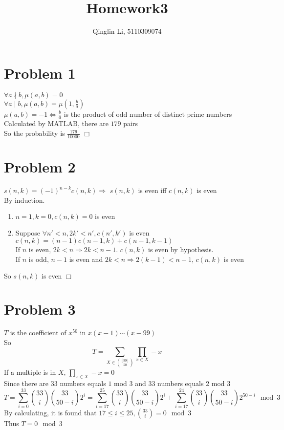 \documentclass[12pt]{article}
\date{}
\title{Homework3}
\author{Qinglin Li, 5110309074}
\def\qed{\hfill\mbox{$\Box$}}
\begin{document}
\maketitle
\section*{Problem 1}
$\forall a\nmid b, \mu(a,b)=0$\\
$\forall a\mid b, \mu(a,b)=\mu(1,\frac{b}{a})$\\
$\mu(a,b)=-1\Longleftrightarrow \frac{b}{a}$ is the product of odd number of distinct prime numbers\\
Calculated by MATLAB, there are $179$ pairs\\
So the probability is $\frac{179}{10000}$
\qed
\section*{Problem 2}
$s(n,k)=(-1)^{n-k}c(n,k)\Rightarrow$ $s(n,k)$ is even iff $c(n,k)$ is even\\
By induction.
\begin{enumerate}
\item
$n=1,k=0, c(n,k)=0$ is even
\item
Suppose $\forall n'<n, 2k'<n', c(n',k')$ is even\\
$c(n,k)=(n-1)c(n-1,k)+c(n-1,k-1)$\\
If $n$ is even, $2k<n\Rightarrow 2k<n-1$. $c(n,k)$ is even by hypothesis.\\
If $n$ is odd, $n-1$ is even and $2k<n\Rightarrow 2(k-1)<n-1$, $c(n,k)$ is even\\
\end{enumerate}
So $s(n,k)$ is even
\qed
\section*{Problem 3}
$T$ is the coefficient of $x^{50}$ in $x(x-1)\cdots(x-99)$\\
So
$$T=\displaystyle\sum_{X\in\binom{[99]}{50}}\prod_{x\in X}-x$$
If a multiple is in $X$, $\prod_{x\in X} -x = 0$\\
Since there are $33$ numbers equals $1$ mod $3$ and $33$ numbers equals 2 mod $3$\\
$$T=\sum_{i=0}^{33}\binom{33}{i}\binom{33}{50-i}2^i=\sum_{i=17}^{25}\binom{33}{i}\binom{33}{50-i}2^i+\sum_{i=17}^{24}\binom{33}{i}\binom{33}{50-i}2^{50-i}\mod 3$$
By calculating, it is found that $17\leq i\leq 25,\binom{33}{i}=0\mod 3$\\
Thus $T=0\mod 3$
\end{document}
